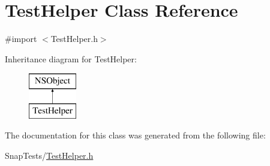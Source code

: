 \hypertarget{interface_test_helper}{}\section{Test\+Helper Class Reference}
\label{interface_test_helper}


{\ttfamily \#import $<$Test\+Helper.\+h$>$}

Inheritance diagram for Test\+Helper\+:\begin{figure}[H]
\begin{center}
\leavevmode
\includegraphics[height=2.000000cm]{interface_test_helper}
\end{center}
\end{figure}


The documentation for this class was generated from the following file\+:\begin{DoxyCompactItemize}
\item 
Snap\+Tests/\hyperlink{_test_helper_8h}{Test\+Helper.\+h}\end{DoxyCompactItemize}
